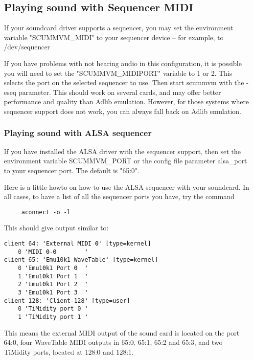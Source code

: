 


\subsection{Playing sound with Sequencer MIDI}

If your soundcard driver supports a sequencer, you may set the environment
variable "SCUMMVM\_MIDI" to your sequencer device -- for example, to 
/dev/sequencer

If you have problems with not hearing audio in this configuration, it is
possible you will need to set the "SCUMMVM\_MIDIPORT" variable to 1 or 2. This
selects the port on the selected sequencer to use. Then start scummvm with the
-eseq parameter. This should work on several cards, and may offer better
performance and quality than Adlib emulation. However, for those systems where
sequencer support does not work, you can always fall back on Adlib emulation.


\subsubsection{Playing sound with ALSA sequencer}

If you have installed the ALSA driver with the sequencer support, then
set the environment variable SCUMMVM\_PORT or the config file parameter
alsa\_port to your sequencer port. The default is "65:0".

Here is a little howto on how to use the ALSA sequencer with your soundcard.
In all cases, to have a list of all the sequencer ports you have, try the
command 
\begin{verbatim}
     aconnect -o -l
\end{verbatim}
This should give output similar to:
\begin{verbatim}
client 64: 'External MIDI 0' [type=kernel]
    0 'MIDI 0-0        '
client 65: 'Emu10k1 WaveTable' [type=kernel]
    0 'Emu10k1 Port 0  '
    1 'Emu10k1 Port 1  '
    2 'Emu10k1 Port 2  '
    3 'Emu10k1 Port 3  '
client 128: 'Client-128' [type=user]
    0 'TiMidity port 0 '
    1 'TiMidity port 1 '
\end{verbatim}
%
This means the external MIDI output of the sound card is located on the
port 64:0, four WaveTable MIDI outputs in 65:0, 65:1, 65:2
and 65:3, and two TiMidity ports, located at 128:0 and 128:1.

